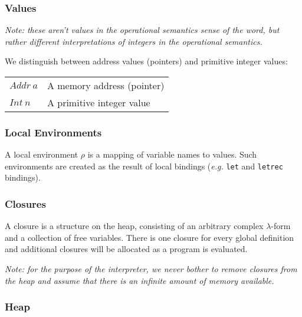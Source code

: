 \subsubsection{Values}

\emph{Note: these aren't values in the operational semantics sense of the word, but rather different interpretations of integers in the operational semantics.}

We distinguish between address values (pointers) and primitive integer values:
\begin{center}
\begin{tabular}{p{1cm}p{6cm}}
$\mathit{Addr}~a$ & A memory address (pointer) \\
$\mathit{Int}~n$  & A primitive integer value
\end{tabular}
\end{center}

\subsubsection{Local Environments}

A local environment $\rho$ is a mapping of variable names to values. Such environments are created as the result of local bindings (\emph{e.g.} \texttt{let} and \texttt{letrec} bindings).

\subsubsection{Closures}

A closure is a structure on the heap, consisting of an arbitrary complex $\lambda$-form and a collection of free variables. There is one closure for every global definition and additional closures will be allocated as a program is evaluated.

\emph{Note: for the purpose of the interpreter, we never bother to remove closures from the heap and assume that there is an infinite amount of memory available.}

\subsubsection{Heap}

